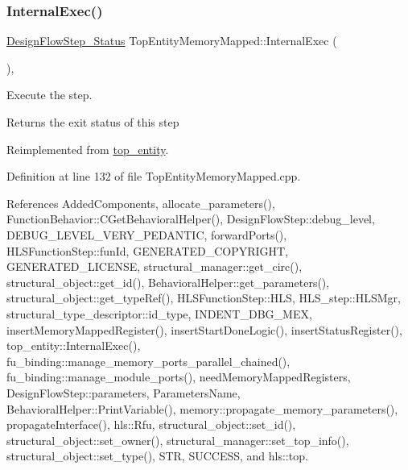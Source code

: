 \subsubsection{\texorpdfstring{Internal\+Exec()}{InternalExec()}}
{\footnotesize\ttfamily \hyperlink{design__flow__step_8hpp_afb1f0d73069c26076b8d31dbc8ebecdf}{Design\+Flow\+Step\+\_\+\+Status} Top\+Entity\+Memory\+Mapped\+::\+Internal\+Exec (\begin{DoxyParamCaption}{ }\end{DoxyParamCaption})\hspace{0.3cm}{\ttfamily [override]}, {\ttfamily [virtual]}}



Execute the step. 

\begin{DoxyReturn}{Returns}
the exit status of this step 
\end{DoxyReturn}


Reimplemented from \hyperlink{classtop__entity_ae3b1c2be3024a1f3abfe3066d8db12fb}{top\+\_\+entity}.



Definition at line 132 of file Top\+Entity\+Memory\+Mapped.\+cpp.



References Added\+Components, allocate\+\_\+parameters(), Function\+Behavior\+::\+C\+Get\+Behavioral\+Helper(), Design\+Flow\+Step\+::debug\+\_\+level, D\+E\+B\+U\+G\+\_\+\+L\+E\+V\+E\+L\+\_\+\+V\+E\+R\+Y\+\_\+\+P\+E\+D\+A\+N\+T\+IC, forward\+Ports(), H\+L\+S\+Function\+Step\+::fun\+Id, G\+E\+N\+E\+R\+A\+T\+E\+D\+\_\+\+C\+O\+P\+Y\+R\+I\+G\+HT, G\+E\+N\+E\+R\+A\+T\+E\+D\+\_\+\+L\+I\+C\+E\+N\+SE, structural\+\_\+manager\+::get\+\_\+circ(), structural\+\_\+object\+::get\+\_\+id(), Behavioral\+Helper\+::get\+\_\+parameters(), structural\+\_\+object\+::get\+\_\+type\+Ref(), H\+L\+S\+Function\+Step\+::\+H\+LS, H\+L\+S\+\_\+step\+::\+H\+L\+S\+Mgr, structural\+\_\+type\+\_\+descriptor\+::id\+\_\+type, I\+N\+D\+E\+N\+T\+\_\+\+D\+B\+G\+\_\+\+M\+EX, insert\+Memory\+Mapped\+Register(), insert\+Start\+Done\+Logic(), insert\+Status\+Register(), top\+\_\+entity\+::\+Internal\+Exec(), fu\+\_\+binding\+::manage\+\_\+memory\+\_\+ports\+\_\+parallel\+\_\+chained(), fu\+\_\+binding\+::manage\+\_\+module\+\_\+ports(), need\+Memory\+Mapped\+Registers, Design\+Flow\+Step\+::parameters, Parameters\+Name, Behavioral\+Helper\+::\+Print\+Variable(), memory\+::propagate\+\_\+memory\+\_\+parameters(), propagate\+Interface(), hls\+::\+Rfu, structural\+\_\+object\+::set\+\_\+id(), structural\+\_\+object\+::set\+\_\+owner(), structural\+\_\+manager\+::set\+\_\+top\+\_\+info(), structural\+\_\+object\+::set\+\_\+type(), S\+TR, S\+U\+C\+C\+E\+SS, and hls\+::top.


